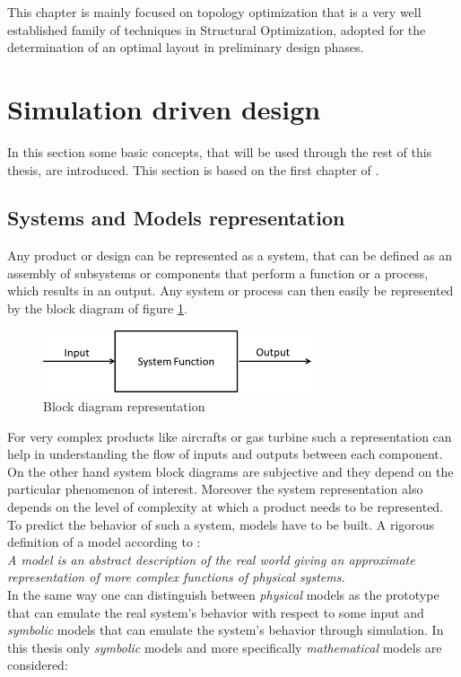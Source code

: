 This chapter is mainly focused on topology optimization that is a very well established family of techniques in Structural Optimization, adopted for the determination of an optimal layout in preliminary design phases.
\section{Simulation driven design}
\label{sec:2.1}
In this section some basic concepts, that will be used through the rest of this thesis, are introduced. This section is based on the first chapter of \cite{papalambros2000principles}.
\subsection{Systems and Models representation}
Any product or design can be represented as a system, that can be defined as an assembly of subsystems or components that perform a function or a process, which results in an output. Any system or process can then easily be represented by the block diagram of figure \ref{fig.2.1}.
\begin{figure}[ht]
\centering
\includegraphics[width=8cm]{images/Ch2/Block_diagram_rep}
\caption{Block diagram representation}
\label{fig.2.1}
\end{figure}
For very complex products like aircrafts or gas turbine such a representation can help in understanding the flow of inputs and outputs between each component. On the other hand system block diagrams are subjective and they depend on the particular phenomenon of interest. Moreover the system representation also depends on the level of complexity at which a product needs to be represented. To predict the behavior of such a system, models have to be built. A rigorous definition of a model according to \cite{papalambros2000principles}:\\
\textit{A model is an abstract description of the real world giving an approximate representation of more complex functions of physical systems.}\\
In the same way one can distinguish between \textit{physical} models as the prototype that can emulate the real system's behavior with respect to some input and \textit{symbolic} models that can emulate the system's behavior through simulation. In this thesis only \textit{symbolic} models and more specifically \textit{mathematical} models are considered:\\
